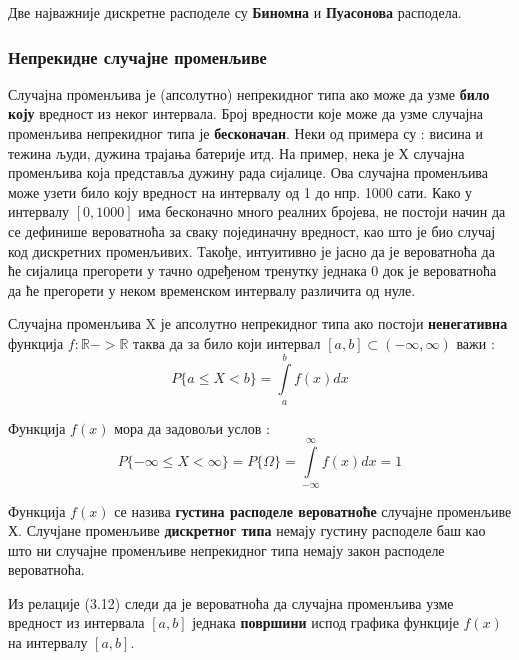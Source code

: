Две најважније дискретне расподеле су \textbf{Биномна} и \textbf{Пуасонова} расподела.

\subsubsection{Непрекидне случајне променљиве}
Случајна променљива је (апсолутно) непрекидног типа ако може да узме \textbf{било коју } вредност из неког интервала. Број вредности које може да узме случајна променљива непрекидног типа је \textbf{бесконачан}. Неки од примера су : висина и тежина људи, дужина трајања батерије итд.
На пример, нека је Х случајна променљива која представља дужину рада сијалице. Ова случајна променљива може узети било коју вредност на интервалу од 1 до нпр. 1000 сати. Како у интервалу $[0,1000]$ има бесконачно много реалних бројева, не постоји начин да се дефинише вероватноћа за сваку појединачну вредност, као што је био случај код дискретних променљивих. Такође, интуитивно је јасно да је вероватноћа да ће сијалица прегорети у тачно одређеном тренутку једнака 0  док је вероватноћа да ће прегорети у неком временском интервалу различита од нуле.


\begin{de}
Случајна променљива X је апсолутно непрекидног типа ако постоји \textbf{ненегативна} функција $ f: \mathbb{R} -> \mathbb{R}$ таква да за било који интервал $[a,b] \subset (- \infty,\infty)$ важи :
\begin{equation}
P \lbrace a \leq X < b \rbrace = \int\limits_{a}^{b} f(x)dx
\end{equation}
\end{de}

Функција $f(x)$ мора да задовољи услов : 
$$
P \lbrace - \infty \leq X <  \infty \rbrace = P \lbrace \Omega \rbrace =  \int\limits_{- \infty}^{\infty} f(x)dx  = 1
$$

Функција $f(x)$ се назива \textbf{густина расподеле вероватноће} случајне променљиве Х.
Случјане променљиве \textbf{дискретног типа } немају густину расподеле баш као што ни случајне променљиве непрекидног типа немају закон расподеле вероватноћа.

Из релације (3.12) следи да је вероватноћа да случајна променљива узме вредност из интервала  $[a,b]$ једнака \textbf{површини} испод графика функције $f(x)$ на интервалу $[a,b]$.




